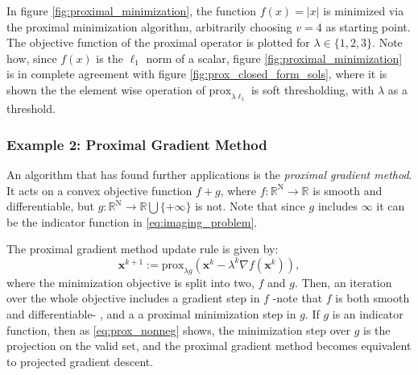 In figure \ref{fig:proximal_minimization}, the function $f(x) = |x|$ is minimized via the proximal minimization algorithm, arbitrarily choosing $v = 4$ as starting point. The objective function of the proximal operator is plotted for $\lambda \in \{1, 2, 3\}$. Note how, since $f(x)$ is the $\ell_1$ norm of a scalar, figure \ref{fig:proximal_minimization} is in complete agreement with figure \ref{fig:prox_closed_form_sols}, where it is shown the the element wise operation of $\mathrm{prox}_{\lambda \ell_1}$ is soft thresholding, with $\lambda$ as a threshold.

\subsubsection{Example 2: Proximal Gradient Method}
An algorithm that has found further applications is the \textit{proximal gradient method}. It acts on a convex objective function $f+g$, where $f: \mathbb{R}^\mathrm{N} \rightarrow \mathbb{R} $ is smooth and differentiable, but $g: \mathbb{R}^\mathrm{N} \rightarrow \mathbb{R} \bigcup \{+\infty \}$ is not. Note that since $g$ includes $\infty$ it can be the indicator function in  \eqref{eq:imaging_problem}. 

The proximal gradient method update rule is given by:
\begin{equation}
    \mathbf{x}^{k+1} := \mathrm{prox}_{\lambda g}(\mathbf{x}^k - \lambda^k \nabla f(\mathbf{x}^k)),
    \label{eq:prox_gradient_descnet}
\end{equation}
where the minimization objective is split into two, $f$ and $g$. Then, an iteration over the whole objective includes a gradient step in $f$ -note that $f$ is both smooth and differentiable- , and a a proximal minimization step in $g$. If $g$ is an indicator function, then as  \eqref{eq:prox_nonneg} shows, the minimization step over $g$ is the projection on the valid set, and the proximal gradient method becomes equivalent to projected gradient descent. %


